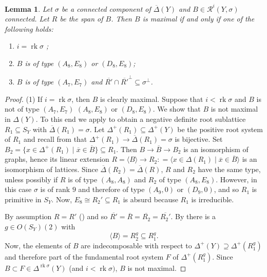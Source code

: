 \documentclass[a4paper]{amsart}
\theoremstyle{definition}
\theoremstyle{plain}
\newtheorem{lemma}[definition]{Lemma}
\DeclareMathOperator{\rk}{rk}
\newcommand{\R}{\mathcal{R}}
\newcommand{\DeltabarY}{\overline{\Delta}(Y)}
\begin{document}
\begin{lemma}\label{lem:maximal-characterization}
Let $\sigma$ be a connected component of $\DeltabarY$ and $B \in \R^i(Y,\sigma)$ connected. Let $R$ be the span of $B$. 
Then $B$ is maximal if and only if one of the following holds:
\begin{enumerate}
    \item $i = \rk \sigma$ ;
    \item $B$ is of type $(A_8,E_8)$ or $(D_8,E_8)$;
    \item $B$ is of type $(A_7,E_7)$ and $\overline{R'}\cap \overline{R'}^\perp\subseteq \sigma^\perp$. 
\end{enumerate}
\end{lemma}
\begin{proof}
(1) If $i = \rk \sigma$, then $B$ is clearly maximal.
Suppose that $i < \rk \sigma$ and $B$ is not of type $(A_7,E_7)$ $(A_8,E_8)$ or $(D_8,E_8)$. We show that $B$ is not maximal in $\Delta(Y)$.
To this end we apply  to obtain a negative definite root sublattice $R_1 \subseteq S_Y$ with $\overline{\Delta}(R_1)=\sigma$. 
Let $\Delta^+(R_1) \subseteq \Delta^+(Y)$ be the positive root system of $R_1$ and recall from  that $\Delta^+(R_1) \to \overline{\Delta}(R_1)=\sigma$ is bijective.
Set $B_2 = \{x\in \Delta^+(R_1) \mid \overline{x} \in \overline{B} \} \subseteq R_1$. Then $B \to \overline{B} \to B_2$ is an isomorphism of graphs, hence its linear extension $R=\langle B \rangle \to R_2:
= \langle x \in \Delta(R_1) \mid \overline{x} \in \overline{B}\rangle$ is an isomorphism of lattices. Since $\overline{\Delta}(R_2)=\overline{\Delta}(R)$, $R$ and $R_2$ have the same type,
unless possibly if $R$ is of type $(A_8,A_8)$ and $R_2$ of type $(A_8,E_8)$. However, in this case $\sigma$ is of rank $9$ and therefore of type $(A_9, 0)$ or $(D_9, 0)$, and so $R_1$ is primitive in $S_Y$. Now, $E_8\cong R_2' \subseteq R_1$ is absurd because $R_1$ is irreducible.

By assumption $R=R'$ () and so $\overline{R'}=\overline{R}=\overline{R_2}=\overline{R_2'}$.
By  there is a $g \in O(S_Y)(2)$ with
\[\langle B \rangle  = R_2^g\subseteq R_1^g.\] 
Now, the elements of $B$ are indecomposable with respect to $\Delta^+(Y)\supseteq \Delta^+(R_1^g)$ and therefore part of the fundamental root system $F$ of $\Delta^+(R_1^g)$.
Since $B \subset F \in \Delta^{\rk \sigma}(Y)$ (and $i< \rk \sigma)$, $B$ is not maximal.


\end{proof}
\end{document}
